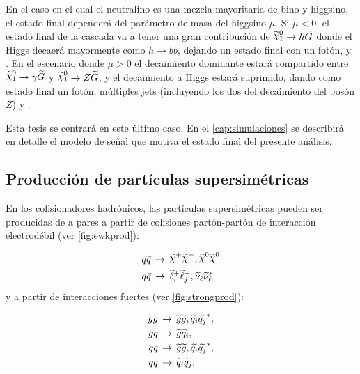 
En el caso en el cual el neutralino es una mezcla mayoritaria de bino y
higgsino, el estado final dependerá del parámetro de masa del higgsino $\mu$. Si
$\mu <0$, el estado final de la cascada va a tener una gran contribución de
$\ninoone \to h\gravino$ donde el Higgs decaerá mayormente como $h\to b
\bar{b}$, dejando un estado final con un fotón, {\bjets} y {\met}. En el
escenario donde $\mu>0$ el decaimiento dominante estará compartido entre
$\ninoone \to \gam\gravino$ y $\ninoone\to Z \gravino$, y el decaimiento a Higgs
estará suprimido, dando como estado final un fotón, múltiples jets (incluyendo
los dos del decaimiento del bosón $Z$) y {\met}.

Esta tesis se centrará en este último caso. En el \cref{cap:simulaciones}
se describirá en detalle el modelo de se\~nal que motiva el estado final
del presente análisis.



\subsection{Producción de partículas supersimétricas}

En los colisionadores hadrónicos, las partículas supersimétricas pueden ser
producidas de a pares a partir de colisiones partón-partón de interacción
electrodébil (ver \cref{fig:ewkprod}):

\begin{align}
  &q\bar{q} \, \to \, \chinop \chinom, \nino \nino \label{eq:qq_ewk} \\
  &q\bar{q} \, \to \, \susy{\ell}^{+}_{i}\susy{\ell}^{-}_{j}, \susy{\nu}_{\ell}\susy{\nu}^{*}_{\ell} \label{eq:qq_ewk2}
\end{align}
%
y a partir de interacciones fuertes (ver \cref{fig:strongprod}):

\begin{align}
  gg \, &\rightarrow \, \widetilde{g}\widetilde{g}, \widetilde{q_i}\widetilde{q_j}^{*}, \label{eq:gg} \\
  gq \, &\rightarrow \, \widetilde{g}\widetilde{q_i}, \label{eq:gq} \\
  q\bar{q} \, &\rightarrow \, \widetilde{g}\widetilde{g}, \widetilde{q_i}\widetilde{q_j}^{*}, \label{eq:qqbar} \\
  qq \, &\rightarrow \, \widetilde{q_i}\widetilde{q_j}, \label{eq:qq}
\end{align}

